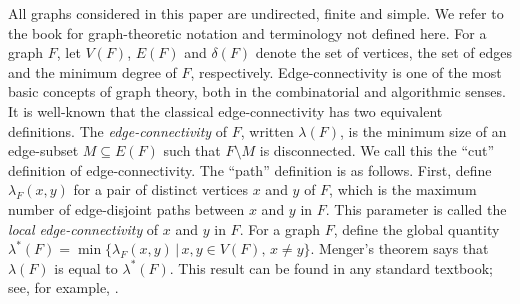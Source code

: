 \documentclass[final]{dmtcs-episciences}
\begin{document}
All graphs considered in this paper are undirected, finite and
simple. We refer to the book \cite{BondyMurty} for graph-theoretic
notation and terminology not defined here. For a graph $F$, let
$V(F)$, $E(F)$ and $\delta(F)$ denote the set of vertices, the set
of edges and the minimum degree of $F$, respectively.
Edge-connectivity is one of the most basic concepts of
graph theory, both in the combinatorial and algorithmic senses. It is well-known that the classical
edge-connectivity has two equivalent definitions. The \emph{edge-connectivity} of $F$, written $\lambda(F)$, is the minimum size
of an edge-subset $M\subseteq E(F)$ such that $F\setminus M$ is
disconnected. We call this the ``cut'' definition of edge-connectivity. The ``path''
definition is as follows. First, define
$\lambda_F(x,y)$ for a pair of distinct vertices $x$ and $y$ of $F$,
which is the maximum number of edge-disjoint paths between $x$ and
$y$ in $F$. This parameter is called the \emph{local
edge-connectivity} of $x$ and $y$ in $F$. For a graph $F$, define the global quantity $\lambda^*(F)=\min\{\lambda_F(x,y)\,|\, x, y\in
V(F), \, x\neq y\}$. Menger's theorem says that $\lambda(F)$ is
equal to $\lambda^*(F)$. This result can be found in any standard textbook; see, for example,
\cite{BondyMurty}.
\end{document}

